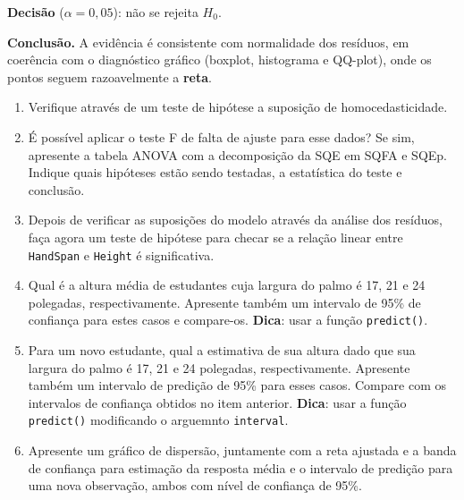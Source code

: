 \documentclass[
]{article}
\begin{document}
\textbf{Decisão} (\(\alpha=0{,}05\)): não se rejeita \(H_0\).

\textbf{Conclusão.} A evidência é consistente com normalidade dos
resíduos, em coerência com o diagnóstico gráfico (boxplot, histograma e
QQ-plot), onde os pontos seguem razoavelmente a \textbf{reta}.

\begin{enumerate}
\def\labelenumi{\arabic{enumi}.}
\setcounter{enumi}{6}
\item
  Verifique através de um teste de hipótese a suposição de
  homocedasticidade.
\item
  É possível aplicar o teste F de falta de ajuste para esse dados? Se
  sim, apresente a tabela ANOVA com a decomposição da SQE em SQFA e
  SQEp. Indique quais hipóteses estão sendo testadas, a estatística do
  teste e conclusão.
\item
  Depois de verificar as suposições do modelo através da análise dos
  resíduos, faça agora um teste de hipótese para checar se a relação
  linear entre \texttt{HandSpan} e \texttt{Height} é significativa.
\item
  Qual é a altura média de estudantes cuja largura do palmo é 17, 21 e
  24 polegadas, respectivamente. Apresente também um intervalo de 95\%
  de confiança para estes casos e compare-os. \textbf{Dica}: usar a
  função \texttt{predict()}.
\item
  Para um novo estudante, qual a estimativa de sua altura dado que sua
  largura do palmo é 17, 21 e 24 polegadas, respectivamente. Apresente
  também um intervalo de predição de 95\% para esses casos. Compare com
  os intervalos de confiança obtidos no item anterior. \textbf{Dica}:
  usar a função \texttt{predict()} modificando o arguemnto
  \texttt{interval}.
\item
  Apresente um gráfico de dispersão, juntamente com a reta ajustada e a
  banda de confiança para estimação da resposta média e o intervalo de
  predição para uma nova observação, ambos com nível de confiança de
  95\%.
\end{enumerate}
\end{document}
